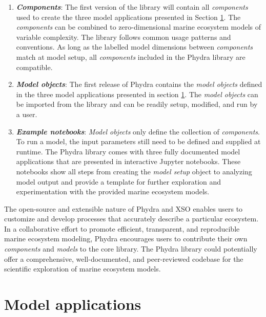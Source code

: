 \documentclass[journal abbreviation, manuscript]{copernicus}
\begin{document}
\begin{enumerate}
    \item \textbf{\textit{Components}}: The first version of the library will contain all \textit{components} used to create the three model applications presented in Section \ref{Section:UseCases}. The \textit{components} can be combined to zero-dimensional marine ecosystem models of variable complexity. The library follows common usage patterns and conventions. As long as the labelled model dimensions between \textit{components} match at model setup, all \textit{components} included in the Phydra library are compatible.
    
    \item \textbf{\textit{Model objects}}: The first release of Phydra contains the \textit{model objects} defined in the three model applications presented in section \ref{Section:UseCases}. The \textit{model objects} can be imported from the library and can be readily setup, modified, and run by a user.
    
    \item \textbf{\textit{Example notebooks}}: \textit{Model objects} only define the collection of \textit{components}. To run a model, the input parameters still need to be defined and supplied at runtime. The Phydra library comes with three fully documented model applications that are presented in interactive Jupyter notebooks. These notebooks show all steps from creating the \textit{model setup} object to analyzing model output and provide a template for further exploration and experimentation with the provided marine ecosystem models.
    
\end{enumerate}

The open-source and extensible nature of Phydra and XSO enables users to customize and develop processes that accurately describe a particular ecosystem. In a collaborative effort to promote efficient, transparent, and reproducible marine ecosystem modeling, Phydra encourages users to contribute their own \textit{components} and \textit{models} to the core library. The Phydra library could potentially offer a comprehensive, well-documented, and peer-reviewed codebase for the scientific exploration of marine ecosystem models.




\section{Model applications} \label{Section:UseCases}
\end{document}
